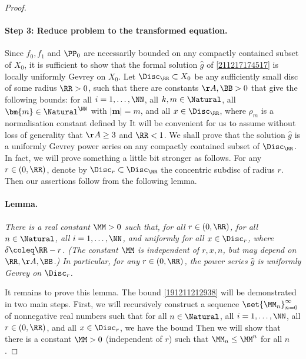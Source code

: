 \documentclass[11pt]{article}
\renewcommand{\mm}{{\bm{m}}}
\begin{document}
\begin{proof}
\paragraph*{Step 3: Reduce problem to the transformed equation.}
Since $f_0, f_1$ and $\PP_0$ are necessarily bounded on any compactly contained subset of $X_0$, it is sufficient to show that the formal solution $\hat{g}$ of \eqref{211217174517} is locally uniformly Gevrey on $X_0$.
Let $\Disc_\RR \subset X_0$ be any sufficiently small disc of some radius $\RR > 0$, such that there are constants $\AA, \BB > 0$ that give the following bounds: for all $i = 1, \ldots, \NN$, all $k,m \in \Natural$, all $\mm \in \Natural^\NN$ with $|\mm| = m$, and all $x \in \Disc_\RR$,
\eqntag{\label{211209172430}
	\big| \GG^i_{k\mm} (x) \big| \leq \rho_m \AA \BB^{k+m} k!
\qqtext{and}
	\big| \lambda^{-1}_i (x) \big| \leq \AA
\fullstop{,}
}
where $\rho_m$ is a normalisation constant defined by
\eqntag{\label{211209172628}
	\frac{1}{\rho_m} \coleq \sum_{|\mm| = m} 1 = \tbinom{m + \NN - 1}{\NN - 1}
\fullstop
}
It will be convenient for us to assume without loss of generality that $\AA \geq 3$ and $\RR < 1$.
We shall prove that the solution $\hat{g}$ is a uniformly Gevrey power series on any compactly contained subset of $\Disc_\RR$.
In fact, we will prove something a little bit stronger as follows.
For any $r \in (0, \RR)$, denote by $\Disc_r \subset \Disc_\RR$ the concentric subdisc of radius $r$.
Then our assertions follow from the following lemma.

\paragraph*{Lemma.}
\textit{
There is a real constant $\MM > 0$ such that, for all $r \in (0,\RR)$,
for all $n \in \Natural$, all $i = 1, \ldots, \NN$, and uniformly for all $x \in \Disc_r$, where $\delta \coleq \RR - r$.
(The constant $\MM$ is independent of $r, x, n$, but may depend on $\RR, \AA, \BB$.)
In particular, for any $r \in (0,\RR)$, the power series $\hat{g}$ is uniformly Gevrey on $\Disc_r$.
}

It remains to prove this lemma.
The bound \eqref{191211212938} will be demonstrated in two main steps.
First, we will recursively construct a sequence $\set{\MM_n}_{n=0}^\infty$ of nonnegative real numbers such that for all $n \in \Natural$, all $i = 1, \ldots, \NN$, all $r \in (0, \RR)$, and all $x \in \Disc_r$, we have the bound
Then we will show that there is a constant $\MM > 0$ (independent of $r$) such that $\MM_n \leq \MM^n$ for all $n$.


\end{proof}
\end{document}
